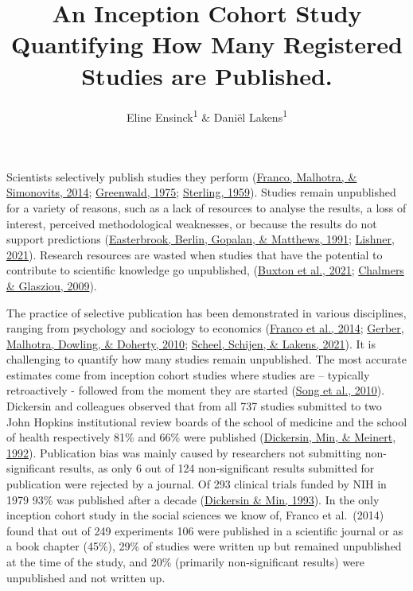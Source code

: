 \documentclass[
  ,jou, a4paper,floatsintext]{apa6}
\title{An Inception Cohort Study Quantifying How Many Registered Studies are Published.}
\author{Eline Ensinck\textsuperscript{1} \& Daniël Lakens\textsuperscript{1}}
\date{}
\affiliation{\vspace{0.5cm}\textsuperscript{1} Eindhoven University of Technology}
\begin{document}
\maketitle

Scientists selectively publish studies they perform (\protect\hyperlink{ref-franco_publication_2014}{Franco, Malhotra, \& Simonovits, 2014}; \protect\hyperlink{ref-greenwald_consequences_1975}{Greenwald, 1975}; \protect\hyperlink{ref-sterling_publication_1959}{Sterling, 1959}). Studies remain unpublished for a variety of reasons, such as a lack of resources to analyse the results, a loss of interest, perceived methodological weaknesses, or because the results do not support predictions (\protect\hyperlink{ref-easterbrook_publication_1991}{Easterbrook, Berlin, Gopalan, \& Matthews, 1991}; \protect\hyperlink{ref-lishner_sorting_2021}{Lishner, 2021}). Research resources are wasted when studies that have the potential to contribute to scientific knowledge go unpublished, (\protect\hyperlink{ref-buxton_avoiding_2021}{Buxton et al., 2021}; \protect\hyperlink{ref-chalmers_avoidable_2009}{Chalmers \& Glasziou, 2009}).

The practice of selective publication has been demonstrated in various disciplines, ranging from psychology and sociology to economics (\protect\hyperlink{ref-franco_publication_2014}{Franco et al., 2014}; \protect\hyperlink{ref-gerber_publication_2010}{Gerber, Malhotra, Dowling, \& Doherty, 2010}; \protect\hyperlink{ref-scheel_excess_2021}{Scheel, Schijen, \& Lakens, 2021}). It is challenging to quantify how many studies remain unpublished. The most accurate estimates come from inception cohort studies where studies are -- typically retroactively - followed from the moment they are started (\protect\hyperlink{ref-song_dissemination_2010}{Song et al., 2010}). Dickersin and colleagues observed that from all 737 studies submitted to two John Hopkins institutional review boards of the school of medicine and the school of health respectively 81\% and 66\% were published (\protect\hyperlink{ref-dickersin_factors_1992}{Dickersin, Min, \& Meinert, 1992}). Publication bias was mainly caused by researchers not submitting non-significant results, as only 6 out of 124 non-significant results submitted for publication were rejected by a journal. Of 293 clinical trials funded by NIH in 1979 93\% was published after a decade (\protect\hyperlink{ref-dickersin_nih_1993}{Dickersin \& Min, 1993}). In the only inception cohort study in the social sciences we know of, Franco et al.~(2014) found that out of 249 experiments 106 were published in a scientific journal or as a book chapter (45\%), 29\% of studies were written up but remained unpublished at the time of the study, and 20\% (primarily non-significant results) were unpublished and not written up.
\end{document}
